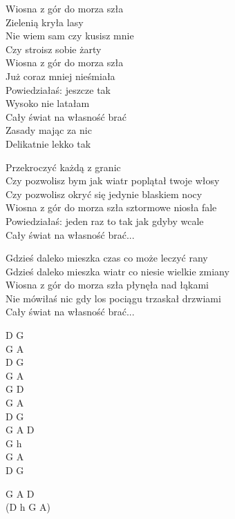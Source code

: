 \begin{text}
    Wiosna z gór do morza szła\\
    Zielenią kryła lasy\\
    Nie wiem sam czy kusisz mnie\\
    Czy stroisz sobie żarty\\
    Wiosna z gór do morza szła\\
    Już coraz mniej nieśmiała\\
    Powiedziałaś: jeszcze tak\\
    Wysoko nie latałam\\
    Cały świat na własność brać\\
    Zasady mając za nic\\
    Delikatnie lekko tak

    Przekroczyć każdą z granic\\
    Czy pozwolisz bym jak wiatr poplątał twoje włosy\\
    Czy pozwolisz okryć się jedynie blaskiem nocy\\
    Wiosna z gór do morza szła sztormowe niosła fale\\
    Powiedziałaś: jeden raz to tak jak gdyby wcale\\
    Cały świat na własność brać...

    Gdzieś daleko mieszka czas co może leczyć rany\\
    Gdzieś daleko mieszka wiatr co niesie wielkie zmiany\\
    Wiosna z gór do morza szła płynęła nad łąkami\\
    Nie mówiłaś nic gdy los pociągu trzaskał drzwiami\\
    Cały świat na własność brać...
\end{text}
\begin{chord}
    D G\\
    G A\\
    D G\\
    G A\\
    G D\\
    G A\\
    D G\\
    G A D\\
    G h\\
    G A\\
    D G

    G A D\\
    (D h G A)
\end{chord}